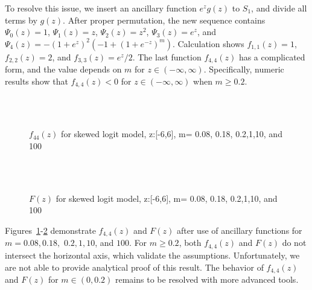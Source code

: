 \documentclass[12pt]{amsart}
\theoremstyle{definition}
\theoremstyle{remark}
\numberwithin{equation}{section}
\begin{document}
To resolve this issue, we insert an ancillary function $e^zg(z)$ to $S_1$, and divide all terms by $g(z)$. After proper permutation, the new sequence contains $\Psi_0(z) = 1$, $\Psi_1(z) = z$, $\Psi_2(z) = z^2$,  $\Psi_3(z) = e^z$, and $\Psi_4(z) =- (1+e^z)^2(-1+(1+e^{-z})^m)$.
Calculation shows $f_{1,1}(z) = 1$, $f_{2,2}(z) =2$, and $f_{3,3}(z) = e^z/2$. The last function $f_{4,4}(z)$ has a complicated form, and the value depends on $m$ for $z\in (-\infty, \infty)$. Specifically, numeric results show that $f_{4,4}(z)<0$ for  $z\in (-\infty, \infty)$ when $m\ge 0.2$.
\begin{figure}[ht]
 \\
\\
\caption{$f_{44}(z)$ for skewed logit model, z:[-6,6], m= 0.08, 0.18, 0.2,1,10, and 100}
\label{fig:skewedlogit_after}
\end{figure}

\begin{figure}[ht]
 \\
\\
\caption{$F(z)$ for skewed logit model, z:[-6,6], m= 0.08, 0.18, 0.2,1,10, and 100}
\label{fig:skewedlogit_after_F}
\end{figure} Figures~\ref{fig:skewedlogit_after}-\ref{fig:skewedlogit_after_F} demonstrate $f_{4,4}(z)$ and $F(z)$ after use of ancillary functions for $m = 0.08, 0.18,$ $ 0.2, 1, 10$, and $100$. For $m\ge0.2$, both $f_{4,4}(z)$ and $F(z)$ do not intersect the horizontal axis, which validate the assumptions.
Unfortunately, we are not able to provide analytical proof of this result. The behavior of $f_{4,4}(z)$ and $F(z)$ for $m\in(0,0.2)$ remains to be resolved with more advanced tools. 


\end{document}
